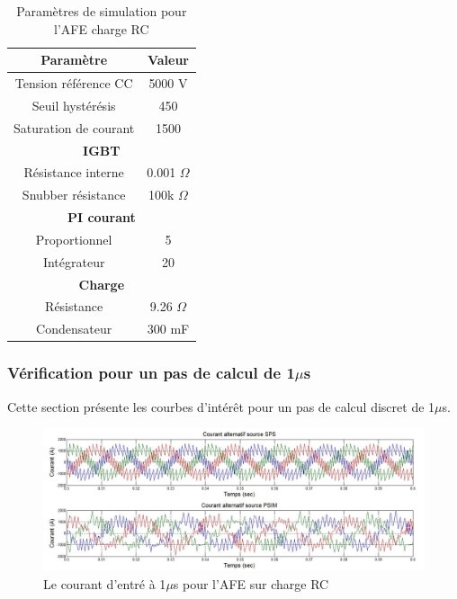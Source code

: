 \documentclass[11pt,letterpaper,final]{report}
\begin{document}
\begin{table}[htb]
\centering
\begin{tabular}{|c|c|} 
  \hline
  \textbf{Paramètre} & \textbf{Valeur}  \\
  \hline\hline
  Tension référence CC & 5000 V\\ \hline
  Seuil hystérésis & 450\\ \hline
  Saturation de courant& 1500 \\ \hline \hline
  \multicolumn{2}{|c|}{\textbf{IGBT}}\\ \hline
  Résistance interne & 0.001 $\Omega$\\
  Snubber résistance & 100k $\Omega$\\ \hline \hline
   \multicolumn{2}{|c|}{\textbf{PI courant}}\\ \hline
  Proportionnel & 5 \\
  Intégrateur & 20 \\ \hline \hline
  \multicolumn{2}{|c|}{\textbf{Charge}}\\ \hline
  Résistance & 9.26 $\Omega$ \\
  Condensateur & 300 mF\\
  \hline
\end{tabular}
\caption{Paramètres de simulation pour l'AFE charge RC}
\label{p_AF_RC}
\end{table}


\subsubsection{Vérification pour un pas de calcul de 1$\mu$s}
Cette section présente les courbes d'intérêt pour un pas de calcul discret de 1$\mu$s. 




\begin{figure}[htb]
\centering
\includegraphics[scale=0.5]{Fig/AFERC/cour_al.jpg}
\caption{Le courant d'entré à 1$\mu$s pour l'AFE sur charge RC}
\label{AF_RC_cou}
\end{figure}
\end{document}
